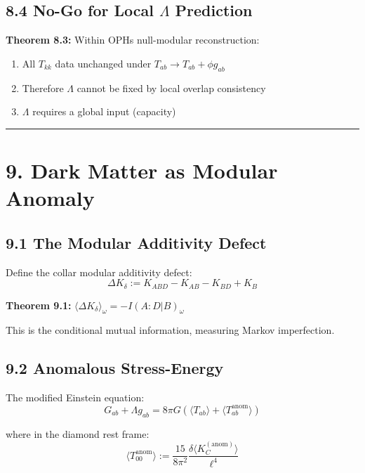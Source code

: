 \subsection{8.4 No-Go for Local $\Lambda$ Prediction}\label{84-no-go-for-local-ux3bb-prediction}

\textbf{Theorem 8.3:} Within OPH\textquotesingle s null-modular reconstruction:

\begin{enumerate}
\def\labelenumi{\arabic{enumi}.}
\tightlist
\item
  All \(T_{kk}\) data unchanged under \(T_{ab} \to T_{ab} + \phi g_{ab}\)
\item
  Therefore \(\Lambda\) cannot be fixed by local overlap consistency
\item
  \(\Lambda\) requires a global input (capacity)
\end{enumerate}

\begin{center}\rule{0.5\linewidth}{0.5pt}\end{center}

\section{9. Dark Matter as Modular Anomaly}\label{9-dark-matter-as-modular-anomaly}

\subsection{9.1 The Modular Additivity Defect}\label{91-the-modular-additivity-defect}

Define the collar modular additivity defect: \[\Delta K_\delta := K_{ABD} - K_{AB} - K_{BD} + K_B\]

\textbf{Theorem 9.1:} \(\langle \Delta K_\delta \rangle_\omega = -I(A:D|B)_\omega\)

This is the conditional mutual information, measuring Markov imperfection.

\subsection{9.2 Anomalous Stress-Energy}\label{92-anomalous-stress-energy}

The modified Einstein equation: \[G_{ab} + \Lambda g_{ab} = 8\pi G \left(\langle T_{ab} \rangle + \langle T_{ab}^{\text{anom}} \rangle\right)\]

where in the diamond rest frame: \[\langle T_{00}^{\text{anom}} \rangle := \frac{15}{8\pi^2} \frac{\delta\langle K_C^{(\text{anom})} \rangle}{\ell^4}\]

